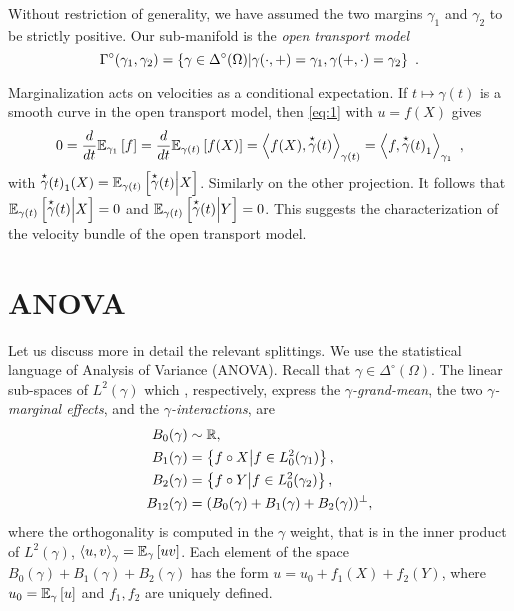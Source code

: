 \documentclass[runningheads]{llncs}
\begin{document}
Without restriction of generality, we have assumed the two margins $\gamma_1$ and $\gamma_2$ to be strictly positive. Our sub-manifold is the \emph{open transport model}
\begin{equation*} \Gamma^\circ(\gamma_1,\gamma_2) = \setof{\gamma \in \Delta^\circ(\Omega)}{\gamma(\cdot,+) = \gamma_1, \gamma(+,\cdot) = \gamma_2} \ .
\end{equation*}

Marginalization acts on velocities as a conditional expectation. If $t \mapsto \gamma(t)$ is a smooth curve in the open transport model, then \cref{eq:1} with $u = f(X)$ gives \begin{equation*} 0 = \derivby t \expectat {\gamma_1} f =  \derivby t \expectat {\gamma(t)} {f(X)} = \scalarat {\gamma(t)}  {f(X)} {\velocity \gamma(t)} = \scalarat {\gamma_1}  f {{\velocity \gamma(t)}_1} \ , \end{equation*} with ${\velocity \gamma(t)}_1(X) = \condexpectat {\gamma(t)} {\velocity \gamma(t)} X$. Similarly on the other projection. It follows that $\condexpectat {\gamma(t)} {\velocity \gamma(t)} X = 0$ and $\condexpectat {\gamma(t)} {\velocity \gamma(t)} Y = 0$. This suggests the characterization of the velocity bundle of the open transport model.

\section{ANOVA}

Let us discuss more in detail the relevant splittings. We use the statistical language of Analysis of Variance (ANOVA). Recall that $\gamma \in \Delta^\circ(\Omega)$. The linear sub-spaces of $L^2(\gamma)$ which , respectively, express the \emph{$\gamma$-grand-mean}, the two \emph{$\gamma$-marginal effects}, and the \emph{$\gamma$-interactions}, are
\begin{equation}\label{eq:ANOVA-spaces} \begin{aligned} B_0(\gamma) &\sim \reals, \\ B_1(\gamma) &= \setof{f\circ X}{f \in L^2_0(\gamma_1)},\\ B_2(\gamma) &= \setof{f\circ Y}{f \in L^2_0(\gamma_2)},\\ B_{12}(\gamma) &= (B_0(\gamma) + B_1(\gamma) + B_2(\gamma))^\perp, \end{aligned} \end{equation}
where the orthogonality is computed in the $\gamma$ weight, that is in the inner product of $L^2(\gamma)$, $\scalarat \gamma u v = \expectat \gamma {uv}$. Each element of the space $B_0(\gamma) + B_1(\gamma) + B_2(\gamma)$ has the form $u = u_0 + f_1(X) + f_2(Y)$, where $u_0 = \expectat \gamma u$ and $f_1,f_2$ are uniquely defined. 
\end{document}
